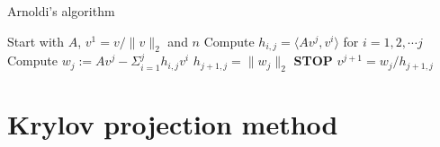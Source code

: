 \begin{algorithm} 
\begin{algorithmic} \caption{Arnoldi's algorithm\cite{saad}} \label{alg:arnoldi}  
\STATE Start with $A$, $v^1 = v/\|v \|_2$ and $n$
   \STATE Compute $h_{i,j} = \langle Av^j,v^i \rangle $ for $i = 1,2,\cdots j$
    \STATE Compute $w_j := A v^j - \Sigma_{i=1}^{j} h_{i,j}v^i $
    \STATE $h_{j+1,j} = \| w_j \|_2$
        \STATE\textbf{STOP}
    \ENDIF 
   \STATE $v^{j+1} = w_j/h_{j+1,j}$
\ENDFOR
\end{algorithmic} 
\end{algorithm}
\section{Krylov projection method} \label{sec:fullKPM}

